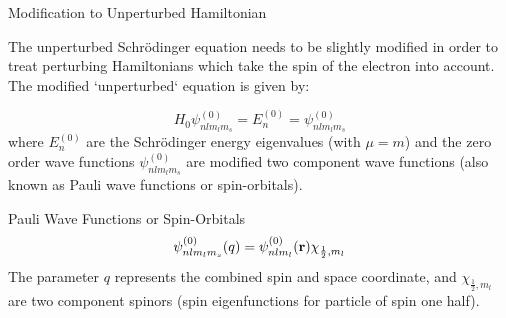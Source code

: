 \documentclass[xcolor=dvipsnames,t]{beamer}
\begin{document}

    \begin{frame}{Modification to Unperturbed Hamiltonian} 
    
    The unperturbed Schr\"odinger 
    equation needs to be slightly modified in order to treat perturbing Hamiltonians
    which take the spin of the electron into account. The modified `unperturbed`
    equation is given by:

    \begin{equation}
        H_0 \psi_{nlm_l m_s }^{(0)} = E_{n}^{(0)} = \psi_{nlm_l m_s}^{(0)} 
    \end{equation}
    where $E_{n}^{(0)}$ are the Schr\"odinger energy eigenvalues (with $\mu = m$) and 
    the zero order wave functions $\psi_{nlm_l m_s}^{(0)}$ are modified two component
    wave functions (also known as Pauli wave functions or spin-orbitals).
    \end{frame} 

    \begin{frame}{Pauli Wave Functions or Spin-Orbitals}  
    \begin{equation}
        \psi_{nlm_l m_s}^{(0)}(q) = \psi_{nlm_l}^{(0)}({\bf r}) \chi_{\frac{1}{2},m_l}
    \end{equation}
    The parameter $q$ represents the combined spin and space coordinate, and 
    $\chi_{\frac{1}{2},m_l}$ are two component spinors (spin eigenfunctions for
    particle of spin one half). 
    \end{frame} 
   
\end{document}
